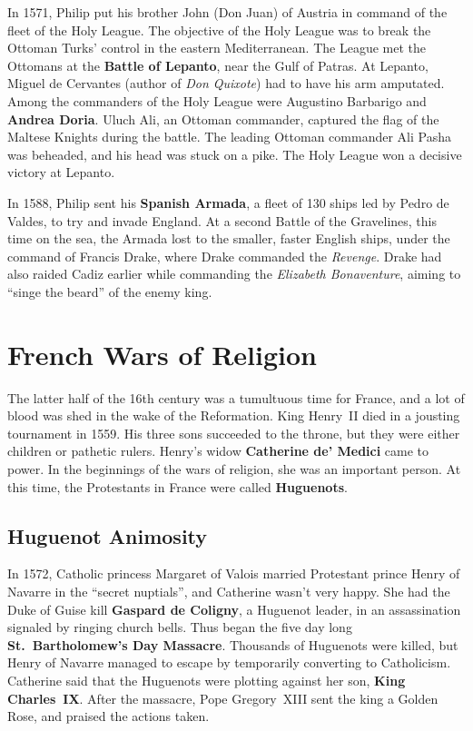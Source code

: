 In 1571, Philip put his brother John (Don Juan) of Austria in command of the fleet of the Holy League.
The objective of the Holy League was to break the Ottoman Turks' control in the eastern Mediterranean.
The League met the Ottomans at the \textbf{Battle of Lepanto}, near the Gulf of Patras.
At Lepanto, Miguel de Cervantes (author of \textit{Don Quixote}) had to have his arm amputated.
Among the commanders of the Holy League were Augustino Barbarigo and \textbf{Andrea Doria}.
Uluch Ali, an Ottoman commander, captured the flag of the Maltese Knights during the battle.
The leading Ottoman commander Ali Pasha was beheaded, and his head was stuck on a pike.
The Holy League won a decisive victory at Lepanto.

In 1588, Philip sent his \textbf{Spanish Armada}, a fleet of 130 ships led by Pedro de Valdes,
to try and invade England.
At a second Battle of the Gravelines, this time on the sea,
the Armada lost to the smaller, faster English ships, under the command of Francis Drake,
where Drake commanded the \textit{Revenge}.
Drake had also raided Cadiz earlier while commanding the \textit{Elizabeth Bonaventure},
aiming to ``singe the beard'' of the enemy king.

\section{French Wars of Religion}

The latter half of the 16th century was a tumultuous time for France,
and a lot of blood was shed in the wake of the Reformation.
King Henry~II died in a jousting tournament in 1559.
His three sons succeeded to the throne, but they were either children or pathetic rulers.
Henry's widow \textbf{Catherine de' Medici} came to power.
In the beginnings of the wars of religion, she was an important person.
At this time, the Protestants in France were called \textbf{Huguenots}.

\subsection*{Huguenot Animosity}

In 1572, Catholic princess Margaret of Valois married
Protestant prince Henry of Navarre in the ``secret nuptials'', and Catherine wasn't very happy.
She had the Duke of Guise kill \textbf{Gaspard de Coligny}, a Huguenot leader,
in an assassination signaled by ringing church bells.
Thus began the five day long \textbf{St.\ Bartholomew's Day Massacre}.
Thousands of Huguenots were killed, but Henry of Navarre managed to escape by temporarily converting to Catholicism.
Catherine said that the Huguenots were plotting against her son, \textbf{King Charles~IX}\@.
After the massacre, Pope Gregory~XIII sent the king a Golden Rose, and praised the actions taken.

